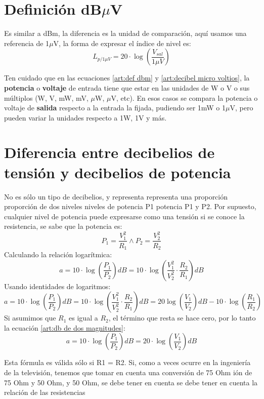 \documentclass[
	12pt, %
	fleqn, %
	a4paper, %
]{LegrandOrangeBook}
\begin{document}
\section{Definición dB$\mu$V}
Es similar a dBm, la diferencia es la unidad de comparación, aquí usamos una referencia de 1$\mu$V, la forma de expresar el índice de nivel es:
\begin{equation}
\label{art:decibel micro voltios}
L_{p/1\mu V}=20\cdot\log\left(\frac{V_{sal}}{1\mu V}\right)
\end{equation}
\begin{remark}
Ten cuidado que en las ecuaciones \ref{art:def dbm} y \ref{art:decibel micro voltios}, la \textbf{potencia} o \textbf{voltaje} de entrada tiene que estar en las unidades de W o V o sus múltiplos (W, V, mW, mV, $\mu$W, $\mu$V, etc). En esos casos se compara la potencia o voltaje de \textbf{salida} respecto a la entrada la fijada, pudiendo ser 1mW o 1$\mu$V, pero pueden variar la unidades respecto a 1W, 1V y más.
\end{remark}
\section{Diferencia entre decibelios de tensión y decibelios de potencia}
No es sólo un tipo de decibelios, y representa representa una proporción proporción de dos niveles niveles de potencia P1 potencia P1 y P2. Por supuesto, cualquier nivel de potencia puede expresarse como una tensión si se conoce la resistencia, se sabe que la potencia es:
\begin{displaymath}
P_1=\frac{V^2_1}{R_1} \land P_2=\frac{V^2_2}{R_2}
\end{displaymath}
Calculando la relación logarítmica:
\begin{displaymath}
a=10\cdot\log\left(\frac{P_1}{P_2}\right)dB=10\cdot\log\left(\frac{V_1^2}{V_2^2}\cdot\frac{R_2}{R_1}\right)dB
\end{displaymath}
Usando identidades de logaritmos:
\begin{equation}
\label{art:db de dos magnitudes}
a=10\cdot\log\left(\frac{P_1}{P_2}\right)dB=10\cdot\log\left(\frac{V_1^2}{V_2^2}\cdot\frac{R_2}{R_1}\right)dB=20\log\left(\frac{V_1}{V_2}\right)dB-10\cdot\log\left(\frac{R_1}{R_2}\right)
\end{equation}
Si asumimos que $R_1$ es igual a $R_2$, el término que resta se hace cero, por lo tanto la ecuación \ref{art:db de dos magnitudes}:
\begin{equation}
\label{art:db 10 20}
a=10\cdot\log\left(\frac{P_1}{P_2}\right)dB=20\cdot\log\left(\frac{V_1}{V_2}\right)dB
\end{equation}
\begin{remark}
Esta fórmula es válida sólo si R1 = R2. Si, como a veces ocurre en la ingeniería de la televisión, tenemos que tomar en cuenta una conversión de 75 Ohm ión de 75 Ohm y 50 Ohm, y 50 Ohm, se debe tener en cuenta se debe tener en  cuenta la relación de las resistencias
\end{remark}
\end{document}
